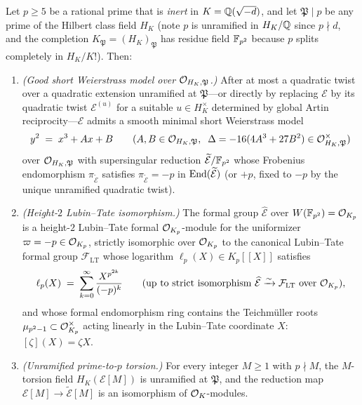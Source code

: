 \begin{theorem}
\label{thm:07:cm-good-models}
Let $p \ge 5$ be a rational prime that is \emph{inert} in $K = \mathbb{Q}(\sqrt{-d})$, and let $\mathfrak{P} \mid p$ be any prime of the Hilbert class field $H_K$ (note $p$ is unramified in $H_K/\mathbb{Q}$ since $p \nmid d$, and the completion $K_{\mathfrak{P}} = (H_K)_{\mathfrak{P}}$ has residue field $\mathbb{F}_{p^2}$ because $p$ splits completely in $H_K / K$!). Then:
\begin{enumerate}[label=\textup{(\roman*)}]
\item \emph{(Good short Weierstrass model over $\mathcal{O}_{H_K, \mathfrak{P}}$.)} After at most a quadratic twist over a quadratic extension unramified at $\mathfrak{P}$—or directly by replacing $\mathcal{E}$ by its quadratic twist $\mathcal{E}^{(u)}$ for a suitable $u \in H_K^\times$ determined by global Artin reciprocity—$\mathcal{E}$ admits a smooth minimal short Weierstrass model
  \[
    y^2 \;=\; x^3 + A x + B \qquad (A, B \in \mathcal{O}_{H_K, \mathfrak{P}},\;\; \Delta = -16(4A^3 + 27B^2) \in \mathcal{O}_{H_K, \mathfrak{P}}^\times)
  \]
  over $\mathcal{O}_{H_K, \mathfrak{P}}$ with supersingular reduction $\widetilde{\mathcal{E}} / \mathbb{F}_{p^2}$ whose Frobenius endomorphism $\pi_{\widetilde{\mathcal{E}}}$ satisfies $\pi_{\widetilde{\mathcal{E}}} = -p$ in $\mathrm{End}(\widetilde{\mathcal{E}})$ (or $+p$, fixed to $-p$ by the unique unramified quadratic twist).
\item \emph{(Height-$2$ Lubin--Tate isomorphism.)} The formal group $\widehat{\mathcal{E}}$ over $W(\mathbb{F}_{p^2}) = \mathcal{O}_{K_p}$ is a height-$2$ Lubin--Tate formal $\mathcal{O}_{K_p}$-module for the uniformizer $\varpi = -p \in \mathcal{O}_{K_p}$, strictly isomorphic over $\mathcal{O}_{K_p}$ to the canonical Lubin--Tate formal group $\mathcal{F}_{\mathrm{LT}}$ whose logarithm $\ell_p(X) \in K_p[[X]]$ satisfies
  \begin{equation}
  \label{eq:07:lt-log}
    \ell_p(X) \;=\; \sum_{k = 0}^{\infty} \frac{X^{p^{2k}}}{(-p)^k} \qquad \text{(up to strict isomorphism } \widehat{\mathcal{E}} \xrightarrow{\sim} \mathcal{F}_{\mathrm{LT}} \text{ over } \mathcal{O}_{K_p}\text{)},
  \end{equation}
  and whose formal endomorphism ring contains the Teichm\"uller roots $\mu_{p^2 - 1} \subset \mathcal{O}_{K_p}^\times$ acting linearly in the Lubin--Tate coordinate $X$: $[\zeta](X) = \zeta X$.
\item \emph{(Unramified prime-to-$p$ torsion.)} For every integer $M \ge 1$ with $p \nmid M$, the $M$-torsion field $H_K(\mathcal{E}[M])$ is unramified at $\mathfrak{P}$, and the reduction map $\mathcal{E}[M] \to \widetilde{\mathcal{E}}[M]$ is an isomorphism of $\mathcal{O}_K$-modules.
\end{enumerate}
\end{theorem}


